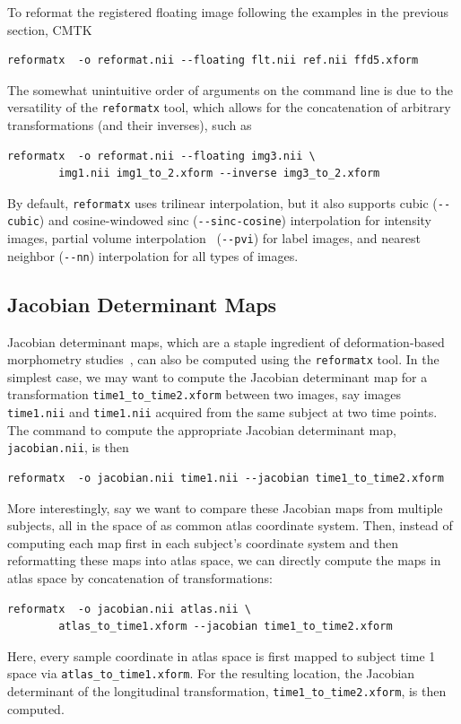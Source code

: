 \documentclass{InsightArticle}
\begin{document}
To reformat the registered floating image following the examples in
the previous section, CMTK
\begin{verbatim}
reformatx  -o reformat.nii --floating flt.nii ref.nii ffd5.xform
\end{verbatim}
The somewhat unintuitive order of arguments on the command line is due to the
versatility of the \verb|reformatx| tool, which allows for the concatenation
of arbitrary transformations (and their inverses), such as
\begin{verbatim}
reformatx  -o reformat.nii --floating img3.nii \
        img1.nii img1_to_2.xform --inverse img3_to_2.xform
\end{verbatim} 
By default, \verb|reformatx| uses trilinear interpolation, but it also
supports cubic (\verb|--cubic|) and cosine-windowed sinc
(\verb|--sinc-cosine|) interpolation for intensity images, partial volume
interpolation~\cite{MaesCollVand:1997} (\verb|--pvi|) for label images, and
nearest neighbor (\verb|--nn|) interpolation for all types of images.

\subsection{Jacobian Determinant Maps}

Jacobian determinant maps, which are a staple ingredient of deformation-based
morphometry studies~\cite{AshbHuttFrac:1998}, can also be computed using the
\verb|reformatx| tool. In the simplest case, we may want to compute the
Jacobian determinant map for a transformation \verb|time1_to_time2.xform|
between two images, say images \verb|time1.nii| and \verb|time1.nii| acquired
from the same subject at two time points. The command to compute the
appropriate Jacobian determinant map, \verb|jacobian.nii|, is then
\begin{verbatim}
reformatx  -o jacobian.nii time1.nii --jacobian time1_to_time2.xform
\end{verbatim}
More interestingly, say we want to compare these Jacobian maps from multiple
subjects, all in the space of as common atlas coordinate system. Then, instead
of computing each map first in each subject's coordinate system and then
reformatting these maps into atlas space, we can directly compute the maps in
atlas space by concatenation of transformations:
\begin{verbatim}
reformatx  -o jacobian.nii atlas.nii \
        atlas_to_time1.xform --jacobian time1_to_time2.xform
\end{verbatim}
Here, every sample coordinate in atlas space is first mapped to subject time 1
space via \verb|atlas_to_time1.xform|. For the resulting location, the
Jacobian determinant of the longitudinal transformation,
\verb|time1_to_time2.xform|, is then computed.
\end{document}
